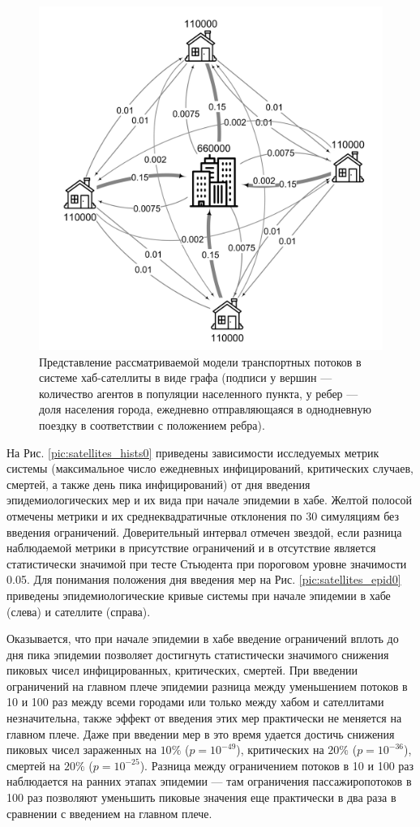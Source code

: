 \documentclass[a4paper,12pt]{article} %
\begin{document}
\begin{figure}[H]
    \centering
    \includegraphics[width=0.6\linewidth]{images/graph1.png}
    \caption{Представление рассматриваемой модели транспортных потоков в системе хаб-сателлиты в виде графа (подписи у вершин --- количество агентов в популяции населенного пункта, у ребер --- доля населения города, ежедневно отправляющаяся в однодневную поездку в соответствии с положением ребра).}
    \label{pic:graph1}
\end{figure}

На Рис. \ref{pic:satellites_hists0} приведены зависимости исследуемых метрик системы (максимальное число ежедневных инфицирований, критических случаев, смертей, а также день пика инфицирований) от дня введения эпидемиологических мер и их вида при начале эпидемии в хабе. Желтой полосой отмечены метрики и их среднеквадратичные отклонения по 30 симуляциям без введения ограничений. Доверительный интервал отмечен звездой, если разница наблюдаемой метрики в присутствие ограничений и в отсутствие является статистически значимой при тесте Стьюдента при пороговом уровне значимости 0.05. Для понимания положения дня введения мер на Рис. \ref{pic:satellites_epid0} приведены эпидемиологические кривые системы при начале эпидемии в хабе (слева) и сателлите (справа).

Оказывается, что при начале эпидемии в хабе введение ограничений вплоть до дня пика эпидемии позволяет достигнуть статистически значимого снижения пиковых чисел инфицированных, критических, смертей. При введении ограничений на главном плече эпидемии разница между уменьшением потоков в 10 и 100 раз между всеми городами или только между хабом и сателлитами незначительна, также эффект от введения этих мер практически не меняется на главном плече. Даже при введении мер в это время удается достичь снижения пиковых чисел зараженных на $10\%$ ($p = 10^{-49}$), критических на $20\%$ ($p = 10^{-36}$), смертей на $20\%$ ($p = 10^{-25}$). Разница между ограничением потоков в 10 и 100 раз наблюдается на ранних этапах эпидемии --- там ограничения пассажиропотоков в 100 раз позволяют уменьшить пиковые значения еще практически в два раза в сравнении с введением на главном плече.
\end{document}
